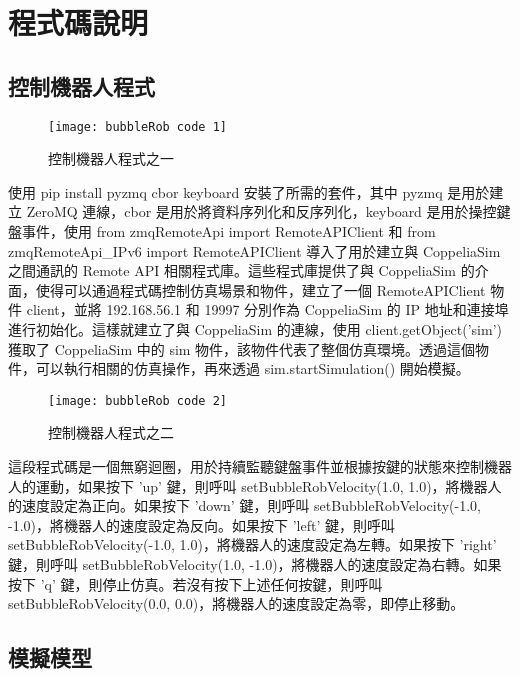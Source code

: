 \chapter{程式碼說明}
\renewcommand{\baselinestretch}{10.0} %
\setcounter{page}{5}  %
\fontsize{14pt}{2.5pt}\sectionef
\section{控制機器人程式}
\begin{figure}[hbt!]
\begin{center}
\texttt{[image: bubbleRob code 1]}
\caption{\Large 控制機器人程式之一}\label{控制機器人程式之一}
\end{center}
\end{figure} 
使用 pip install pyzmq cbor keyboard 安裝了所需的套件，其中 pyzmq 是用於建立 ZeroMQ 連線，cbor 是用於將資料序列化和反序列化，keyboard 是用於操控鍵盤事件，使用 from zmqRemoteApi import RemoteAPIClient 和 from zmqRemoteApi_IPv6 import RemoteAPIClient 導入了用於建立與 CoppeliaSim 之間通訊的 Remote API 相關程式庫。這些程式庫提供了與 CoppeliaSim 的介面，使得可以通過程式碼控制仿真場景和物件，建立了一個 RemoteAPIClient 物件 client，並將 192.168.56.1 和 19997 分別作為 CoppeliaSim 的 IP 地址和連接埠進行初始化。這樣就建立了與 CoppeliaSim 的連線，使用 client.getObject('sim') 獲取了 CoppeliaSim 中的 sim 物件，該物件代表了整個仿真環境。透過這個物件，可以執行相關的仿真操作，再來透過  sim.startSimulation() 開始模擬。\\
\begin{figure}[hbt!]
\begin{center}
\texttt{[image: bubbleRob code 2]}
\caption{\Large 控制機器人程式之二}\label{控制機器人程式之二}
\end{center}
\end{figure} 
這段程式碼是一個無窮迴圈，用於持續監聽鍵盤事件並根據按鍵的狀態來控制機器人的運動，如果按下 'up' 鍵，則呼叫 setBubbleRobVelocity(1.0, 1.0)，將機器人的速度設定為正向。如果按下 'down' 鍵，則呼叫 setBubbleRobVelocity(-1.0, -1.0)，將機器人的速度設定為反向。如果按下 'left' 鍵，則呼叫 setBubbleRobVelocity(-1.0, 1.0)，將機器人的速度設定為左轉。如果按下 'right' 鍵，則呼叫 setBubbleRobVelocity(1.0, -1.0)，將機器人的速度設定為右轉。如果按下 'q' 鍵，則停止仿真。若沒有按下上述任何按鍵，則呼叫 setBubbleRobVelocity(0.0, 0.0)，將機器人的速度設定為零，即停止移動。
\section{模擬模型}
\renewcommand{\baselinestretch}{1} %
\newpage